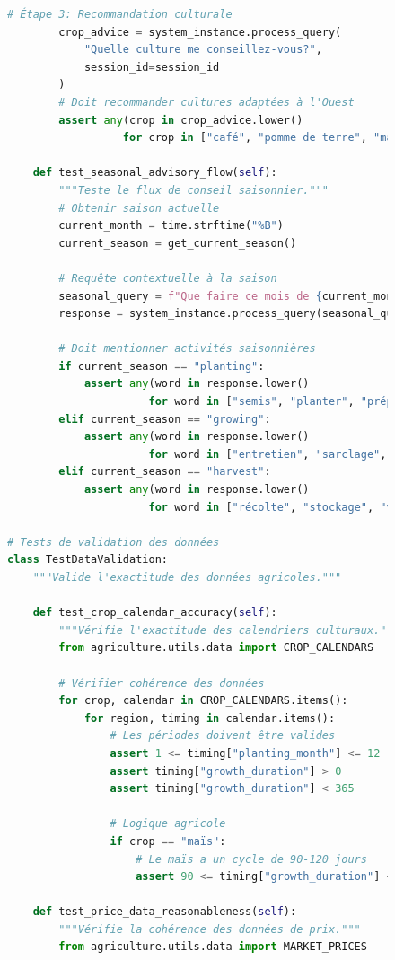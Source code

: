 \begin{figure}[H]
\begin{lstlisting}[language=Python, caption=Suite de tests d'intégration]
        # Étape 3: Recommandation culturale
        crop_advice = system_instance.process_query(
            "Quelle culture me conseillez-vous?",
            session_id=session_id
        )
        # Doit recommander cultures adaptées à l'Ouest
        assert any(crop in crop_advice.lower()
                  for crop in ["café", "pomme de terre", "maraîcher"])

    def test_seasonal_advisory_flow(self):
        """Teste le flux de conseil saisonnier."""
        # Obtenir saison actuelle
        current_month = time.strftime("%B")
        current_season = get_current_season()

        # Requête contextuelle à la saison
        seasonal_query = f"Que faire ce mois de {current_month}?"
        response = system_instance.process_query(seasonal_query)

        # Doit mentionner activités saisonnières
        if current_season == "planting":
            assert any(word in response.lower()
                      for word in ["semis", "planter", "préparer"])
        elif current_season == "growing":
            assert any(word in response.lower()
                      for word in ["entretien", "sarclage", "fertilisation"])
        elif current_season == "harvest":
            assert any(word in response.lower()
                      for word in ["récolte", "stockage", "vente"])

# Tests de validation des données
class TestDataValidation:
    """Valide l'exactitude des données agricoles."""

    def test_crop_calendar_accuracy(self):
        """Vérifie l'exactitude des calendriers culturaux."""
        from agriculture.utils.data import CROP_CALENDARS

        # Vérifier cohérence des données
        for crop, calendar in CROP_CALENDARS.items():
            for region, timing in calendar.items():
                # Les périodes doivent être valides
                assert 1 <= timing["planting_month"] <= 12
                assert timing["growth_duration"] > 0
                assert timing["growth_duration"] < 365

                # Logique agricole
                if crop == "maïs":
                    # Le maïs a un cycle de 90-120 jours
                    assert 90 <= timing["growth_duration"] <= 120

    def test_price_data_reasonableness(self):
        """Vérifie la cohérence des données de prix."""
        from agriculture.utils.data import MARKET_PRICES


\end{lstlisting}
\end{figure}
